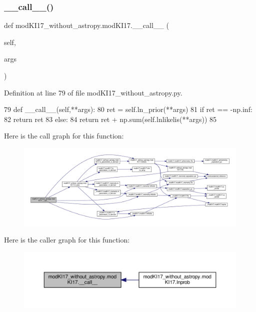 \subsubsection{\texorpdfstring{\+\_\+\+\_\+call\+\_\+\+\_\+()}{\_\_call\_\_()}}
{\footnotesize\ttfamily def mod\+K\+I17\+\_\+without\+\_\+astropy.\+mod\+K\+I17.\+\_\+\+\_\+call\+\_\+\+\_\+ (\begin{DoxyParamCaption}\item[{}]{self,  }\item[{}]{args }\end{DoxyParamCaption})}



Definition at line 79 of file mod\+K\+I17\+\_\+without\+\_\+astropy.\+py.


\begin{DoxyCode}
79     \textcolor{keyword}{def }\_\_call\_\_(self,**args):
80         ret = self.ln\_prior(**args)
81         \textcolor{keywordflow}{if} ret == -np.inf:
82             \textcolor{keywordflow}{return} ret
83         \textcolor{keywordflow}{else}:
84             \textcolor{keywordflow}{return} ret + np.sum(self.lnlikelis(**args)) 
85         
\end{DoxyCode}
Here is the call graph for this function\+:\nopagebreak
\begin{figure}[H]
\begin{center}
\leavevmode
\includegraphics[width=350pt]{d3/df4/classmodKI17__without__astropy_1_1modKI17_aee859d09f6c45a00d6dfa09f40fcd474_cgraph}
\end{center}
\end{figure}
Here is the caller graph for this function\+:\nopagebreak
\begin{figure}[H]
\begin{center}
\leavevmode
\includegraphics[width=350pt]{d3/df4/classmodKI17__without__astropy_1_1modKI17_aee859d09f6c45a00d6dfa09f40fcd474_icgraph}
\end{center}
\end{figure}
